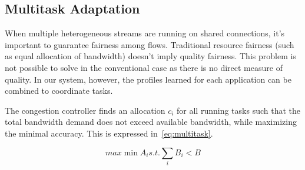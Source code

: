 \subsection{Multitask Adaptation}
\label{sec:multitask-adaptation}

When multiple heterogeneous streams are running on shared connections, it's
important to guarantee fairness among flows. Traditional resource fairness (such
as equal allocation of bandwidth) doesn't imply quality fairness. This problem
is not possible to solve in the conventional case as there is no direct measure
of quality. In our system, however, the profiles learned for each application
can be combined to coordinate tasks.

The congestion controller finds an allocation $c_i$ for all running tasks such
that the total bandwidth demand does not exceed available bandwidth, while
maximizing the minimal accuracy. This is expressed in~\autoref{eq:multitask}.

\begin{equation}
  max \min{A_i} s.t. \sum_i{B_i} < B
  \label{eq:multitask}
\end{equation}

\newpage

